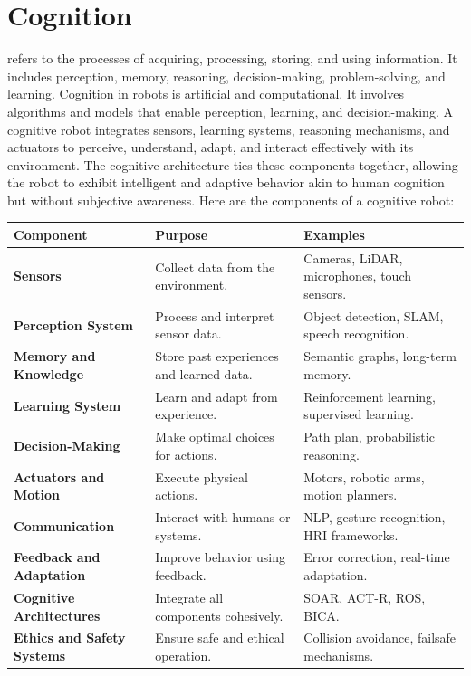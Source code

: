 \section{Cognition}
refers to the processes of acquiring, processing, storing, and using information. It includes perception, memory, reasoning, decision-making, problem-solving, and learning. Cognition in robots is artificial and computational. It involves algorithms and models that enable perception, learning, and decision-making. A cognitive robot integrates sensors, learning systems, reasoning mechanisms, and actuators to perceive, understand, adapt, and interact effectively with its environment. The cognitive architecture ties these components together, allowing the robot to exhibit intelligent and adaptive behavior akin to human cognition but without subjective awareness. Here are the components of a cognitive robot:
    \begin{tabular}{|l|l|l|}
        \hline
        \textbf{Component} & \textbf{Purpose} & \textbf{Examples} \\ \hline
        \textbf{Sensors} & Collect data from the environment. & Cameras, LiDAR, microphones, touch sensors. \\ \hline
        \textbf{Perception System} & Process and interpret sensor data. & Object detection, SLAM, speech recognition. \\ \hline
        \textbf{Memory and Knowledge} & Store past experiences and learned data. & Semantic graphs, long-term memory. \\ \hline
        \textbf{Learning System} & Learn and adapt from experience. & Reinforcement learning, supervised learning. \\ \hline
        \textbf{Decision-Making} & Make optimal choices for actions. & Path plan, probabilistic reasoning. \\ \hline
        \textbf{Actuators and Motion} & Execute physical actions. & Motors, robotic arms, motion planners. \\ \hline
        \textbf{Communication} & Interact with humans or systems. & NLP, gesture recognition, HRI frameworks. \\ \hline
        \textbf{Feedback and Adaptation} & Improve behavior using feedback. & Error correction, real-time adaptation. \\ \hline
        \textbf{Cognitive Architectures} & Integrate all components cohesively. & SOAR, ACT-R, ROS, BICA. \\ \hline
        \textbf{Ethics and Safety Systems} & Ensure safe and ethical operation. & Collision avoidance, failsafe mechanisms. \\ \hline
    \end{tabular}



